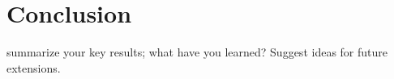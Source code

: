 \section{Conclusion}
summarize your key results; what have you learned? Suggest ideas for future extensions. 
